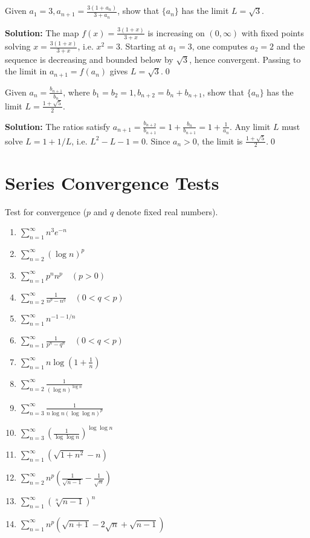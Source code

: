 \begin{problembox}
Given \(a_1 = 3, a_{n+1} = \frac{3(1 + a_n)}{3 + a_n}\), show that \(\{a_n\}\) has the limit \(L = \sqrt{3}\).
\end{problembox}

\noindent\textbf{Solution:}
The map \(f(x)=\tfrac{3(1+x)}{3+x}\) is increasing on \((0,\infty)\) with fixed points solving \(x=\tfrac{3(1+x)}{3+x}\), i.e. \(x^2=3\). Starting at \(a_1=3\), one computes \(a_2=2\) and the sequence is decreasing and bounded below by \(\sqrt{3}\), hence convergent. Passing to the limit in \(a_{n+1}=f(a_n)\) gives \(L=\sqrt{3}\).\qed


\begin{problembox}
Given \(a_n = \frac{b_{n+1}}{b_n}\), where \(b_1 = b_2 = 1, b_{n+2} = b_n + b_{n+1}\), show that \(\{a_n\}\) has the limit \(L = \frac{1 + \sqrt{5}}{2}\).
\end{problembox}

\noindent\textbf{Solution:}
The ratios satisfy \(a_{n+1}=\tfrac{b_{n+2}}{b_{n+1}}=1+\tfrac{b_n}{b_{n+1}}=1+\tfrac{1}{a_n}\). Any limit \(L\) must solve \(L=1+1/L\), i.e. \(L^2-L-1=0\). Since \(a_n>0\), the limit is \(\tfrac{1+\sqrt{5}}{2}\).\qed
\section{Series Convergence Tests}



\begin{problembox}
Test for convergence (\(p\) and \(q\) denote fixed real numbers).
\begin{enumerate}[label=\alph*)]
\item \(\sum_{n=1}^{\infty} n^3 e^{-n}\)
\item \(\sum_{n=2}^{\infty} (\log n)^p\)
\item \(\sum_{n=1}^{\infty} p^n n^p \quad (p > 0)\)
\item \(\sum_{n=2}^{\infty} \frac{1}{n^p - n^q} \quad (0 < q < p)\)
\item \(\sum_{n=1}^{\infty} n^{-1-1/n}\)
\item \(\sum_{n=1}^{\infty} \frac{1}{p^n - q^n} \quad (0 < q < p)\)
\item \(\sum_{n=1}^{\infty} n \log \left(1 + \frac{1}{n}\right)\)
\item \(\sum_{n=2}^{\infty} \frac{1}{(\log n)^{\log n}}\)
\item \(\sum_{n=3}^{\infty} \frac{1}{n \log n (\log \log n)^p}\)
\item \(\sum_{n=3}^{\infty} \left( \frac{1}{\log \log n} \right)^{\log \log n}\)
\item \(\sum_{n=1}^{\infty} (\sqrt{1 + n^2} - n)\)
\item \(\sum_{n=2}^{\infty} n^p \left( \frac{1}{\sqrt{n - 1}} - \frac{1}{\sqrt{n}} \right)\)
\item \(\sum_{n=1}^{\infty} (\sqrt[n]{n - 1})^n\)
\item \(\sum_{n=1}^{\infty} n^p (\sqrt{n + 1} - 2\sqrt{n} + \sqrt{n - 1})\)
\end{enumerate}
\end{problembox}



